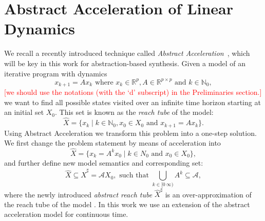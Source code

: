 \documentclass[twocolumn]{autart}    %
\newcommand{\mat}[1]{{#1}}
\renewcommand{\vec}[1]{{#1}}
\renewcommand{\note}[1]{\textcolor{red}{[#1]}}
\begin{document}
\section{Abstract Acceleration of Linear Dynamics} 
\label{ssec:aa}
 
We recall a recently introduced technique called \emph{Abstract Acceleration}~\cite{JSS14,cattaruzza2015unbounded}, 
which will be key in this work for abstraction-based synthesis.  
Given a model of an iterative program with dynamics
%
\begin{equation}
\vec{x}_{k+1}=\mat{A}\vec{x}_k \text{ where } \vec{x}_k \in \mathbb{R}^p, \mat{A} \in \mathbb{R}^{p \times p} \text{ and } k \in \mathbb N_0,
\end{equation}
%
\textcolor{red}{[we should use the notations (with the `d' subscript) in the Preliminaries section.]}
we want to find all possible states visited over an infinite time horizon
starting at an initial set $X_0$.  
This set is known as the \emph{reach tube} of
the model:
%
\begin{equation}
\hat{X} = \{ \vec{x}_k \mid k \in \mathbb N_0, \vec{x}_0 \in X_0 \text{ and } \vec{x}_{k+1}=\mat{A}\vec{x}_k\}.
\end{equation}
%
Using Abstract Acceleration we
transform this problem into a one-step solution.  We first change the
problem statement by means of acceleration into
%
\begin{equation}
\hat{X} = \{ \vec{x}_k=\mat{A}^k\vec{x}_0 \mid k \in N_0 \text{ and } \vec{x}_0 \in X_0 \}, 
\end{equation}
%
and further define new model semantics and corresponding set: 
%
\begin{equation}\label{eq:aa_reachtube}
\hat{X} \subseteq \hat{X}^\sharp = \mathcal{A}X_0, \text{ such that } \bigcup_{k \in [0\ \infty)} \mat{A}^k \subseteq \mathcal{A}, 
\end{equation}
%
where the newly introduced \emph{abstract reach tube} $\hat{X}^\sharp$ is an
over-approximation of the reach tube of the model \cite{JSS14}.  
In this work we use an extension of the abstract acceleration model for
continuous time. 
\end{document}
